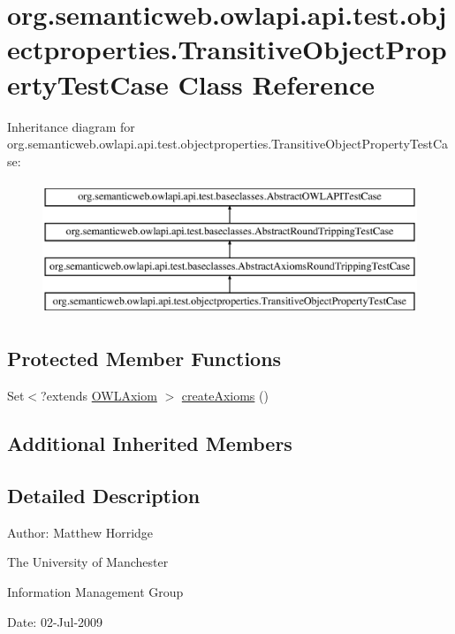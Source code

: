 \hypertarget{classorg_1_1semanticweb_1_1owlapi_1_1api_1_1test_1_1objectproperties_1_1_transitive_object_property_test_case}{\section{org.\-semanticweb.\-owlapi.\-api.\-test.\-objectproperties.\-Transitive\-Object\-Property\-Test\-Case Class Reference}
\label{classorg_1_1semanticweb_1_1owlapi_1_1api_1_1test_1_1objectproperties_1_1_transitive_object_property_test_case}
}
Inheritance diagram for org.\-semanticweb.\-owlapi.\-api.\-test.\-objectproperties.\-Transitive\-Object\-Property\-Test\-Case\-:\begin{figure}[H]
\begin{center}
\leavevmode
\includegraphics[height=4.000000cm]{classorg_1_1semanticweb_1_1owlapi_1_1api_1_1test_1_1objectproperties_1_1_transitive_object_property_test_case}
\end{center}
\end{figure}
\subsection*{Protected Member Functions}
\begin{DoxyCompactItemize}
\item 
Set$<$?extends \hyperlink{interfaceorg_1_1semanticweb_1_1owlapi_1_1model_1_1_o_w_l_axiom}{O\-W\-L\-Axiom} $>$ \hyperlink{classorg_1_1semanticweb_1_1owlapi_1_1api_1_1test_1_1objectproperties_1_1_transitive_object_property_test_case_a7555f9e2c1f7ac2f3738b31c7806b383}{create\-Axioms} ()
\end{DoxyCompactItemize}
\subsection*{Additional Inherited Members}


\subsection{Detailed Description}
Author\-: Matthew Horridge\par
 The University of Manchester\par
 Information Management Group\par
 Date\-: 02-\/\-Jul-\/2009 

